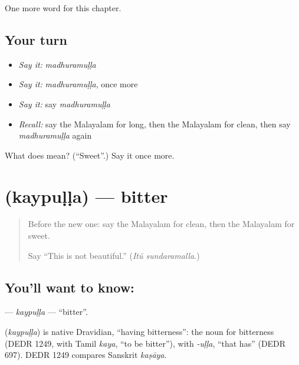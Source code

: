 \begin{grammarlens}[title={What you've built}]
One more word for this chapter.
\end{grammarlens}

\subsection*{Your turn}
\begin{itemize}
\raggedright
  \item \emph{Say it:} \emph{madhuramuḷḷa}
  \item \emph{Say it:} \emph{madhuramuḷḷa}, once more
  \item \emph{Say it:} say \emph{madhuramuḷḷa}
  \item \emph{Recall:} say the Malayalam for long, then the Malayalam for clean, then say \emph{madhuramuḷḷa} again
\end{itemize}

\begin{tcolorbox}[breakable,colback=teal!4,colframe=teal!35!black,title={Before you move on}]
What does  mean? (\textquotedblleft{}Sweet\textquotedblright{}.) Say it once more.
\end{tcolorbox}
\section[\texorpdfstring{\ml{കയ്പുള്ള} (kaypuḷḷa)}{കയ്പുള്ള (kaypuḷḷa)}]{ (kaypuḷḷa) — bitter}

\label{lesson:ML-C165-kaypulla}



\begin{quote}
Before the new one: say the Malayalam for clean, then the Malayalam for sweet.

Say \textquotedblleft{}This is not beautiful.\textquotedblright{} (\emph{Itŭ sundaramalla}.)
\end{quote}

\subsection*{You'll want to know: }
\textbf{} — \emph{kaypuḷḷa} — \textquotedblleft{}bitter\textquotedblright{}.

\begin{cousinweb}
\textbf{} (\emph{kaypuḷḷa}) is native Dravidian, \textquotedblleft{}having bitterness\textquotedblright{}: the noun for bitterness (DEDR 1249, with Tamil \emph{kaya}, \textquotedblleft{}to be bitter\textquotedblright{}), with \emph{-uḷḷa}, \textquotedblleft{}that has\textquotedblright{} (DEDR 697). DEDR 1249 compares Sanskrit \emph{kaṣāya}.
\end{cousinweb}

